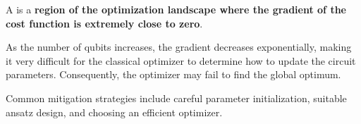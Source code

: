 \highspace
\begin{definitionbox}
    A  is a \textbf{region of the optimization landscape where the gradient of the cost function is extremely close to zero}.
    
    As the number of qubits increases, the gradient decreases exponentially, making it very difficult for the classical optimizer to determine how to update the circuit parameters. Consequently, the optimizer may fail to find the global optimum.
    
    Common mitigation strategies include careful parameter initialization, suitable ansatz design, and choosing an efficient optimizer.
\end{definitionbox}